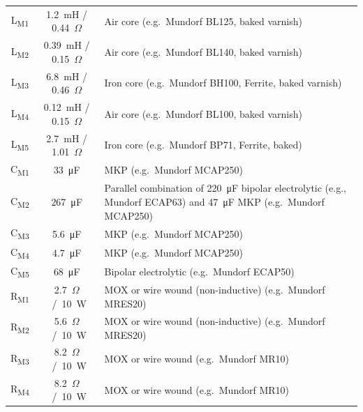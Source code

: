\documentclass[12pt,a4paper]{article}
\providecommand{\inductor}[1]{L\textsubscript{#1}}
\providecommand{\capacitor}[1]{C\textsubscript{#1}}
\providecommand{\resistor}[1]{R\textsubscript{#1}}
\providecommand{\Ohm}{$\Omega$}
\begin{document}
\begin{table}[p]
\begin{tabular}{ccp{}}
\inductor{M1}	& \SI{1.2}{mH} / \SI{0.44}{\Ohm}	& Air core (e.g.~Mundorf BL125, baked varnish)\\
\inductor{M2}	& \SI{0.39}{mH} / \SI{0.15}{\Ohm}	& Air core (e.g.~Mundorf BL140, baked varnish)\\
\inductor{M3}	& \SI{6.8}{mH} / \SI{0.46}{\Ohm}	& Iron core (e.g.~Mundorf BH100, Ferrite, baked varnish)\\
\inductor{M4}	& \SI{0.12}{mH} / \SI{0.15}{\Ohm}	& Air core (e.g.~Mundorf BL100, baked varnish)\\
\inductor{M5}	& \SI{2.7}{mH} / \SI{1.01}{\Ohm}	& Iron core (e.g.~Mundorf BP71, Ferrite, baked)\\
\capacitor{M1}	& \SI{33}{\micro F}			& MKP (e.g.~Mundorf MCAP250)\\
\capacitor{M2}	& \SI{267}{\micro F}			& Parallel combination of \SI{220}{\micro F} bipolar electrolytic (e.g., Mundorf ECAP63) and \SI{47}{\micro F} MKP (e.g.~Mundorf MCAP250)\\
\capacitor{M3}	& \SI{5.6}{\micro F}			& MKP (e.g.~Mundorf MCAP250)\\
\capacitor{M4}	& \SI{4.7}{\micro F}			& MKP (e.g.~Mundorf MCAP250)\\
\capacitor{M5}	& \SI{68}{\micro F}			& Bipolar electrolytic (e.g.~Mundorf ECAP50)\\
\resistor{M1}	& \SI{2.7}{\Ohm} / \SI{10}{W}		& MOX or wire wound (non-inductive) (e.g.~Mundorf MRES20)\\
\resistor{M2}	& \SI{5.6}{\Ohm} / \SI{10}{W}		& MOX or wire wound (non-inductive) (e.g.~Mundorf MRES20)\\
\resistor{M3}	& \SI{8.2}{\Ohm} / \SI{10}{W}		& MOX or wire wound (e.g.~Mundorf MR10)\\
\resistor{M4}	& \SI{8.2}{\Ohm} / \SI{10}{W}		& MOX or wire wound (e.g.~Mundorf MR10)\\

\midrule


\end{tabular}
\end{table}
\end{document}
